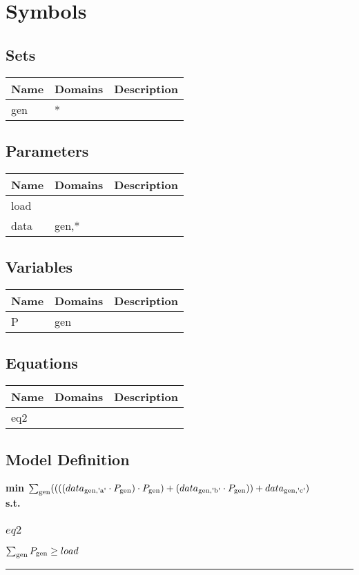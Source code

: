 \documentclass[11pt]{article}
\begin{document}
\section*{Symbols}


\subsection*{Sets}
\begin{tabularx}{\textwidth}{| l | l | X |}
\hline
\textbf{Name} & \textbf{Domains} & \textbf{Description}\\
\hline
\endhead

gen & * & \\
\hline
\end{tabularx}
\subsection*{Parameters}
\begin{tabularx}{\textwidth}{| l | l | X |}
\hline
\textbf{Name} & \textbf{Domains} & \textbf{Description}\\
\hline
\endhead

load &  & \\
data & gen,* & \\
\hline
\end{tabularx}
\subsection*{Variables}
\begin{tabularx}{\textwidth}{| l | l | X |}
\hline
\textbf{Name} & \textbf{Domains} & \textbf{Description}\\
\hline
\endhead

P & gen & \\
\hline
\end{tabularx}
\subsection*{Equations}
\begin{tabularx}{\textwidth}{| l | l | X |}
\hline
\textbf{Name} & \textbf{Domains} & \textbf{Description}\\
\hline
\endhead

eq2 &  & \\
\hline
\end{tabularx}
\subsection*{Model Definition}
\textbf{min} $\sum_\text{gen} ((((data_\text{\text{gen},\text{\textquotesingle a\textquotesingle}} \cdot P_\text{\text{gen}}) \cdot P_\text{\text{gen}}) + (data_\text{\text{gen},\text{\textquotesingle b\textquotesingle}} \cdot P_\text{\text{gen}})) + data_\text{\text{gen},\text{\textquotesingle c\textquotesingle}})$\\
\textbf{s.t.}
\subsubsection*{$eq2$}
$
\sum_\text{gen} P_\text{\text{gen}} \geq load
$
\vspace{5pt}
\hrule
\bigskip
\end{document}
